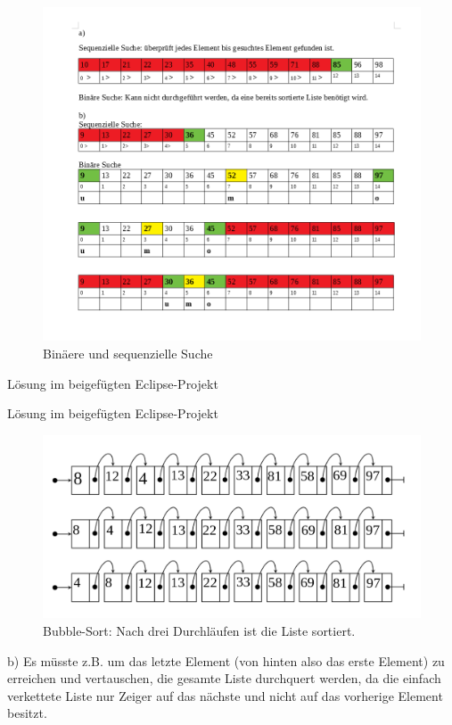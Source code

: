 \documentclass[12pt]{scrartcl}
\begin{document}

\exercise{}
\begin{figure}[h]
\centering
\includegraphics[scale=0.5]{BinaryAndSequentialSort.png}
\caption{Binäere und sequenzielle Suche}
\end{figure}


\exercise{}
Lösung im beigefügten Eclipse-Projekt

\exercise{}
Lösung im beigefügten Eclipse-Projekt

\exercise{}
\begin{figure}[h]
\includegraphics[scale=0.5]{BubbleSort.png}
\caption{Bubble-Sort: Nach drei Durchläufen ist die Liste sortiert.}
\end{figure}

b) Es müsste z.B. um das letzte Element (von hinten also das erste Element) zu erreichen und vertauschen, die gesamte Liste durchquert werden, da die einfach verkettete Liste nur Zeiger auf das nächste und nicht auf das vorherige Element besitzt.

\end{document}
